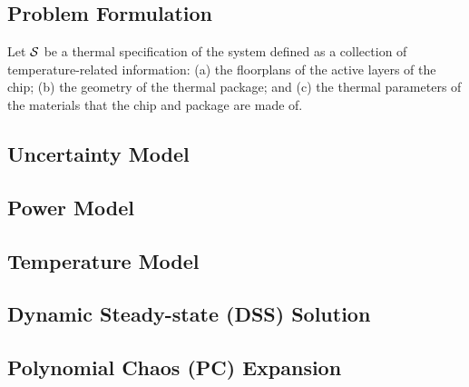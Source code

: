 \subsection{Problem Formulation} 
Let $\mathcal{S}$ be a thermal specification of the system defined as a collection of temperature-related information: (a) the floorplans of the active layers of the chip; (b) the geometry of the thermal package; and (c) the thermal parameters of the materials that the chip and package are made of.

\subsection{Uncertainty Model}


\subsection{Power Model}


\subsection{Temperature Model}


\subsection{Dynamic Steady-state (DSS) Solution}


\subsection{Polynomial Chaos (PC) Expansion}
